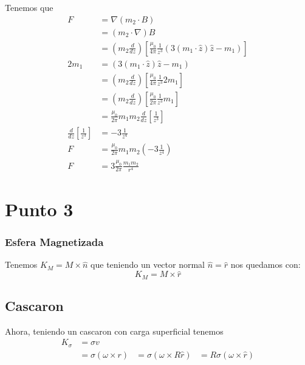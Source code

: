 \documentclass{report}
\begin{document}
\subsection{}

Tenemos que
\begin{align*}
  F &= \nabla (m_2 \cdot B)\\
  &= (m_2 \cdot \nabla)B\\
  &= \left(m_2 \frac{d}{dz} \right)\left[ \frac{\mu_0}{4\pi} \frac{1}{z^3} (3(m_1\cdot\hat{z})\hat{z} - m_1)\right]\\
  2 m_1 &= (3(m_1\cdot\hat{z})\hat{z} - m_1)\\
  &= \left(m_2 \frac{d}{dz} \right)\left[ \frac{\mu_0}{4\pi} \frac{1}{z^3} 2m_1\right]\\
  &= \left(m_2 \frac{d}{dz} \right)\left[ \frac{\mu_0}{2\pi} \frac{1}{z^3} m_1\right]\\
  &= \frac{\mu_0}{2\pi} m_1 m_2 \frac{d}{dz} \left[ \frac{1}{z^3} \right]\\
  \frac{d}{dz} \left[ \frac{1}{z^3} \right] &= - 3 \frac{1}{z^4}\\
  F &= \frac{\mu_0}{2\pi} m_1 m_2 \left( - 3 \frac{1}{z^4} \right)\\
  F &= 3 \frac{\mu_0}{2\pi} \frac{m_1m_2}{r^4}
\end{align*}

\chapter{Punto 3}

\subsection{Esfera Magnetizada}

Tenemos $K_M = M \times \hat{n}$ que teniendo un vector normal $\hat{n} = \hat{r}$ nos quedamos con:
\[
  K_M = M \times \hat{r}
\]

\section{Cascaron}

Ahora, teniendo un cascaron con carga superficial tenemos
\begin{align*}
  K_\sigma &= \sigma v\\
  &= \sigma (\omega \times r)
  &= \sigma (\omega \times R\hat{r})
  &= R\sigma (\omega \times \hat{r})
\end{align*}
\end{document}
